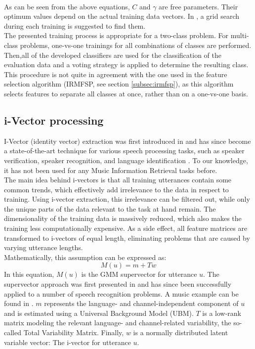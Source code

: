 \medskip
\\
As can be seen from the above equations, $C$ and $\gamma$ are free parameters. Their optimum values depend on the actual training data vectors. In \cite{techreport:practical_svm}, a grid search during each training is suggested to find them. 
\medskip
\\
The presented training process is appropriate for a two-class problem. For multi-class problems, one-vs-one trainings for all combinations of classes are performed. Then,all of the developed classifiers are used for the classification of the evaluation data and a voting strategy is applied to determine the resulting class. This procedure is not quite in agreement with the one used in the feature selection algorithm (IRMFSP, see section \ref{subsec:irmfsp}), as this algorithm selects features to separate all classes at once, rather than on a one-vs-one basis.


\subsection{i-Vector processing}
I-Vector (identity vector) extraction was first introduced in \cite{Dehak2011} and has since become a state-of-the-art technique for various speech processing tasks, such as speaker verification, speaker recognition, and language identification \cite{Martinez2011}. To our knowledge, it has not been used for any Music Information Retrieval tasks before. \\
The main idea behind i-vectors is that all training utterances contain some common trends, which effectively add irrelevance to the data in respect to training. Using i-vector extraction, this irrelevance can be filtered out, while only the unique parts of the data relevant to the task at hand remain. The dimensionality of the training data is massively reduced, which also makes the training less computationally expensive. As a side effect, all feature matrices are transformed to i-vectors of equal length, eliminating problems that are caused by varying utterance lengths.\\
Mathematically, this assumption can be expressed as:
\begin{equation}
M(u) = m+Tw
\end{equation}
In this equation, $M(u)$ is the GMM supervector for utterance $u$. The supervector approach was first presented in \cite{reynolds00} and has since been successfully applied to a number of speech recognition problems. A music example can be found in \cite{Charbuillet2011}. $m$ represents the language- and channel-independent component of $u$ and is estimated using a Universal Background Model (UBM). $T$ is a low-rank matrix modeling the relevant language- and channel-related variability, the so-called Total Variability Matrix. Finally, $w$ is a normally distributed latent variable vector: The i-vector for utterance $u$.

